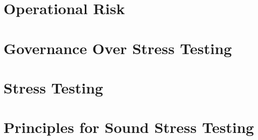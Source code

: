 \documentclass[11pt,fleqn]{report} %
\numberwithin{equation}{section} %
\numberwithin{figure}{section} %
\numberwithin{table}{section} %
\begin{document}
\chapter{Operational Risk}

\chapter{Governance Over Stress Testing}

\chapter{Stress Testing}

\chapter{Principles for Sound Stress Testing}

 
 
 
 
 
 
 
 
 
\end{document}
